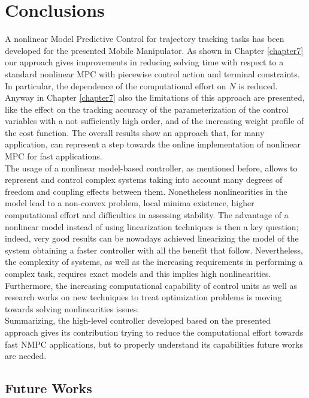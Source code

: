 
\chapter{Conclusions}
\label{conclusions}
A nonlinear Model Predictive Control for trajectory tracking tasks has been developed for the presented Mobile Manipulator. As shown in Chapter \ref{chapter7} our approach gives improvements in reducing solving time with respect to a standard nonlinear MPC with piecewise control action and terminal constraints. In particular, the dependence of the computational effort on $N$ is reduced. Anyway in Chapter \ref{chapter7} also the limitations of this approach are presented, like the effect on the tracking accuracy of the parameterization of the control variables with a not sufficiently high order, and of the increasing weight profile of the cost function. The overall results show an approach that, for many application, can represent a step towards the online implementation of nonlinear MPC for fast applications. \\
The usage of a nonlinear model-based controller, as mentioned before, allows to represent and control complex systems taking into account many degrees of freedom and coupling effects between them. Nonetheless nonlinearities in the model lead to a non-convex problem, local minima existence, higher computational effort and difficulties in assessing stability. The advantage of a nonlinear model instead of using linearization techniques is then a key question; indeed, very good results can be nowadays achieved linearizing the model of the system obtaining a faster controller with all the benefit that follow. Nevertheless, the complexity of systems, as well as the increasing requirements in performing a complex task, requires exact models and this implies high nonlinearities. Furthermore, the increasing computational capability of control units as well as research works on new techniques to treat optimization problems is moving towards solving nonlinearities issues.\\
Summarizing, the high-level controller developed based on the presented approach gives its contribution trying to reduce the computational effort towards fast NMPC applications, but to properly understand its capabilities future works are needed.

\section{Future Works}

